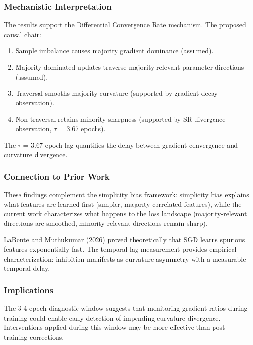 
\subsubsection{Mechanistic Interpretation}

The results support the Differential Convergence Rate mechanism. The proposed causal chain:

\begin{enumerate}
\item Sample imbalance causes majority gradient dominance (assumed).
\item Majority-dominated updates traverse majority-relevant parameter directions (assumed).
\item Traversal smooths majority curvature (supported by gradient decay observation).
\item Non-traversal retains minority sharpness (supported by SR divergence observation, $\tau$ = 3.67 epochs).
\end{enumerate}

The $\tau$ = 3.67 epoch lag quantifies the delay between gradient convergence and curvature divergence.

\subsubsection{Connection to Prior Work}

These findings complement the simplicity bias framework: simplicity bias explains what features are learned first (simpler, majority-correlated features), while the current work characterizes what happens to the loss landscape (majority-relevant directions are smoothed, minority-relevant directions remain sharp).

LaBonte and Muthukumar (2026) proved theoretically that SGD learns spurious features exponentially fast. The temporal lag measurement provides empirical characterization: inhibition manifests as curvature asymmetry with a measurable temporal delay.

\subsubsection{Implications}

The 3-4 epoch diagnostic window suggests that monitoring gradient ratios during training could enable early detection of impending curvature divergence. Interventions applied during this window may be more effective than post-training corrections.

